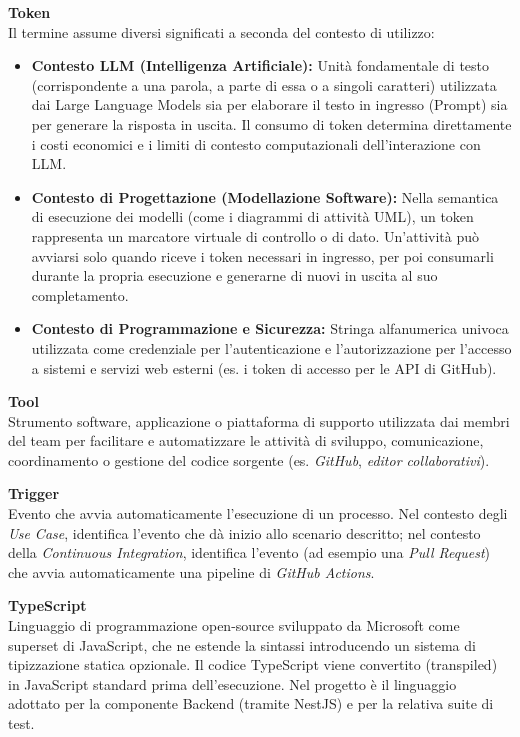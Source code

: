 \documentclass[12pt, a4paper]{article}
\begin{document}
\newpage
\noindent\hypertarget{token}{\textbf{Token}} \\[0.1em]
Il termine assume diversi significati a seconda del contesto di utilizzo:
\begin{itemize}
    \item \textbf{Contesto LLM (Intelligenza Artificiale):} Unità fondamentale di testo (corrispondente a una parola, a parte di essa o a singoli caratteri) utilizzata dai Large Language Models sia per elaborare il testo in ingresso (Prompt) sia per generare la risposta in uscita. Il consumo di token determina direttamente i costi economici e i limiti di contesto computazionali dell'interazione con LLM.
    \item \textbf{Contesto di Progettazione (Modellazione Software):} Nella semantica di esecuzione dei modelli (come i diagrammi di attività UML), un token rappresenta un marcatore virtuale di controllo o di dato. Un'attività può avviarsi solo quando riceve i token necessari in ingresso, per poi consumarli durante la propria esecuzione e generarne di nuovi in uscita al suo completamento.
    \item \textbf{Contesto di Programmazione e Sicurezza:} Stringa alfanumerica univoca utilizzata come credenziale per l'autenticazione e l'autorizzazione per l'accesso a sistemi e servizi web esterni (es. i token di accesso per le API di GitHub).
\end{itemize}
\vspace{0.5cm}

\noindent\hypertarget{tool}{\textbf{Tool}} \\[0.1em]
Strumento software, applicazione o piattaforma di supporto utilizzata dai membri del team per facilitare e automatizzare le attività di sviluppo, comunicazione, coordinamento o gestione del codice sorgente (es. \textit{GitHub}, \textit{editor collaborativi}).
\vspace{0.5cm}

\noindent\hypertarget{trigger}{\textbf{Trigger}} \\[0.1em]
Evento che avvia automaticamente l'esecuzione di un processo. Nel contesto degli \textit{Use Case}, identifica l'evento che dà inizio allo scenario descritto; nel contesto della \textit{Continuous Integration}, identifica l'evento (ad esempio una \textit{Pull Request}) che avvia automaticamente una pipeline di \textit{GitHub Actions}.
\vspace{0.5cm}

\noindent\hypertarget{typescript}{\textbf{TypeScript}} \\[0.1em]
Linguaggio di programmazione open-source sviluppato da Microsoft come superset di JavaScript, che ne estende la sintassi introducendo un sistema di tipizzazione statica opzionale. Il codice TypeScript viene convertito (transpiled) in JavaScript standard prima dell'esecuzione. Nel progetto è il linguaggio adottato per la componente Backend (tramite NestJS) e per la relativa suite di test.
\vspace{0.5cm}
\end{document}
